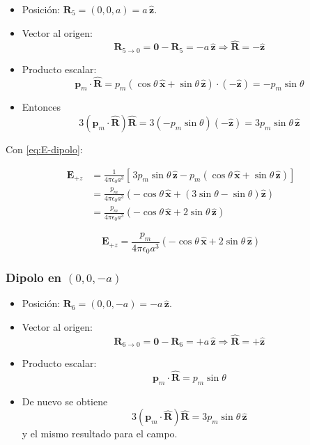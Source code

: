\documentclass{article}
\begin{document}
\begin{itemize}
  \item Posición: $\mathbf{R}_{5} = (0,0,a) = a\,\hat{\mathbf{z}}$.
  \item Vector al origen:
    \[
    \mathbf{R}_{5\to 0} = \mathbf{0} - \mathbf{R}_{5}
    = -a\,\hat{\mathbf{z}}
    \Rightarrow \hat{\mathbf{R}} = -\hat{\mathbf{z}}
    \]
  \item Producto escalar:
    \[
    \mathbf{p}_{m}\cdot\hat{\mathbf{R}}
    = p_{m}(\cos\theta\,\hat{\mathbf{x}} + \sin\theta\,\hat{\mathbf{z}})
      \cdot(-\hat{\mathbf{z}})
    = -p_{m}\sin\theta
    \]
  \item Entonces
    \[
    3(\mathbf{p}_{m}\cdot\hat{\mathbf{R}})\hat{\mathbf{R}}
    = 3(-p_{m}\sin\theta)(-\hat{\mathbf{z}})
    = 3p_{m}\sin\theta\,\hat{\mathbf{z}}
    \]
\end{itemize}

Con \eqref{eq:E-dipolo}:

\begin{align}
\mathbf{E}_{+z}
&= \frac{1}{4\pi\epsilon_{0}a^{3}}
\left[\,3p_{m}\sin\theta\,\hat{\mathbf{z}}
       - p_{m}(\cos\theta\,\hat{\mathbf{x}}
              + \sin\theta\,\hat{\mathbf{z}})\right]\\[4pt]
&= \frac{p_{m}}{4\pi\epsilon_{0}a^{3}}
\left(-\cos\theta\,\hat{\mathbf{x}}
      + (3\sin\theta - \sin\theta)\hat{\mathbf{z}}\right)\\[4pt]
&= \frac{p_{m}}{4\pi\epsilon_{0}a^{3}}
\left(-\cos\theta\,\hat{\mathbf{x}} + 2\sin\theta\,\hat{\mathbf{z}}\right)
\end{align}

\begin{equation}
\boxed{
\mathbf{E}_{+z}
= \frac{p_{m}}{4\pi\epsilon_{0}a^{3}}
  \left(-\cos\theta\,\hat{\mathbf{x}} + 2\sin\theta\,\hat{\mathbf{z}}\right)
}
\label{eq:Ez-mas}
\end{equation}

\subsubsection*{Dipolo en $(0,0,-a)$}

\begin{itemize}
  \item Posición: $\mathbf{R}_{6} = (0,0,-a) = -a\,\hat{\mathbf{z}}$.
  \item Vector al origen:
    \[
    \mathbf{R}_{6\to 0} = \mathbf{0} - \mathbf{R}_{6}
    = +a\,\hat{\mathbf{z}}
    \Rightarrow \hat{\mathbf{R}} = +\hat{\mathbf{z}}
    \]
  \item Producto escalar:
    \[
    \mathbf{p}_{m}\cdot\hat{\mathbf{R}}
    = p_{m}\sin\theta
    \]
  \item De nuevo se obtiene
    \[
    3(\mathbf{p}_{m}\cdot\hat{\mathbf{R}})\hat{\mathbf{R}}
    = 3p_{m}\sin\theta\,\hat{\mathbf{z}}
    \]
    y el mismo resultado para el campo.
\end{itemize}
\end{document}
